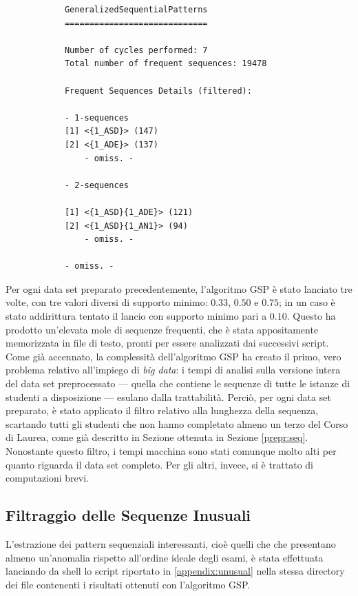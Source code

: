         \begin{lstlisting}
            GeneralizedSequentialPatterns
            =============================

            Number of cycles performed: 7
            Total number of frequent sequences: 19478

            Frequent Sequences Details (filtered):

            - 1-sequences
            [1] <{1_ASD}> (147)
            [2] <{1_ADE}> (137)
                - omiss. -

            - 2-sequences

            [1] <{1_ASD}{1_ADE}> (121)
            [2] <{1_ASD}{1_AN1}> (94)
                - omiss. -

            - omiss. -
        \end{lstlisting}

        Per ogni data set preparato precedentemente, l'algoritmo GSP è stato lanciato tre volte, con tre valori diversi di supporto minimo: $0.33$, $0.50$ e $0.75$; in un caso è stato addirittura tentato il lancio con supporto minimo pari a $0.10$. Questo ha prodotto un'elevata mole di sequenze frequenti, che è stata appositamente memorizzata in file di testo, pronti per essere analizzati dai successivi script. \\

        Come già accennato, la complessità dell'algoritmo GSP ha creato il primo, vero problema relativo all'impiego di \textit{big data}: i tempi di analisi sulla versione intera del data set preprocessato --- quella che contiene le sequenze di tutte le istanze di studenti a disposizione --- esulano dalla trattabilità. Perciò, per ogni data set preparato, è stato applicato il filtro relativo alla lunghezza della sequenza, scartando tutti gli studenti che non hanno completato almeno un terzo del Corso di Laurea, come già descritto in Sezione ottenuta in Sezione \ref{prepr:seq}. Nonostante questo filtro, i tempi macchina sono stati comunque molto alti per quanto riguarda il data set completo. Per gli altri, invece, si è trattato di computazioni brevi. \\

    \subsection{Filtraggio delle Sequenze Inusuali}

    L'estrazione dei pattern sequenziali interessanti, cioè quelli che che presentano almeno un'anomalia rispetto all'ordine ideale degli esami, è stata effettuata lanciando da shell lo script riportato in \ref{appendix:unusual} nella stessa directory dei file contenenti i risultati ottenuti con l'algoritmo GSP. \\

